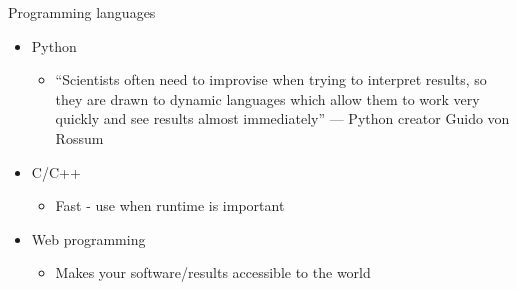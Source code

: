 \begin{frame}{Programming languages}
  \begin{itemize}
  \item Python
    \begin{itemize}
    \item ``Scientists often need to improvise when trying to interpret results, so they are drawn to dynamic languages which allow them to work very quickly and see results almost immediately'' --- Python creator Guido von Rossum
    \end{itemize}
    \pause
  \item C/C++
    \begin{itemize}
    \item Fast - use when runtime is important
    \end{itemize}
    \pause
  \item Web programming
    \begin{itemize}
    \item Makes your software/results accessible to the world
    \end{itemize}
  \end{itemize}
\end{frame}
